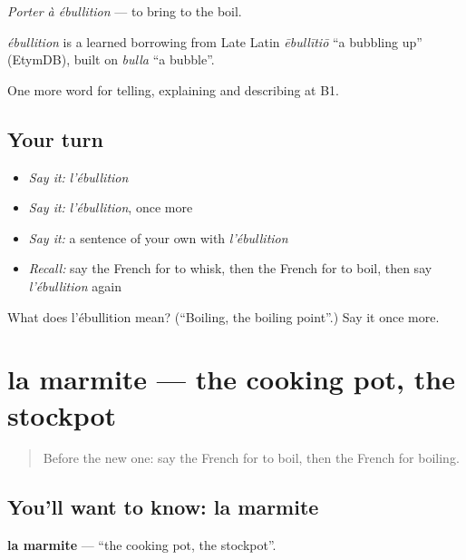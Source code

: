 \emph{Porter à ébullition} — to bring to the boil.

\begin{cousinweb}
\emph{ébullition} is a learned borrowing from Late Latin \emph{ēbullītiō} \textquotedblleft{}a bubbling up\textquotedblright{} (EtymDB), built on \emph{bulla} \textquotedblleft{}a bubble\textquotedblright{}.
\end{cousinweb}

\begin{grammarlens}[title={What you've built}]
One more word for telling, explaining and describing at B1.
\end{grammarlens}

\subsection*{Your turn}
\begin{itemize}
\raggedright
  \item \emph{Say it:} \emph{l'ébullition}
  \item \emph{Say it:} \emph{l'ébullition}, once more
  \item \emph{Say it:} a sentence of your own with \emph{l'ébullition}
  \item \emph{Recall:} say the French for to whisk, then the French for to boil, then say \emph{l'ébullition} again
\end{itemize}

\begin{tcolorbox}[breakable,colback=teal!4,colframe=teal!35!black,title={Before you move on}]
What does l'ébullition mean? (\textquotedblleft{}Boiling, the boiling point\textquotedblright{}.) Say it once more.
\end{tcolorbox}
\section[la marmite]{la marmite — the cooking pot, the stockpot}

\label{lesson:FR-C330-marmite}



\begin{quote}
Before the new one: say the French for to boil, then the French for boiling.
\end{quote}

\subsection*{You'll want to know: la marmite}
\textbf{la marmite} — \textquotedblleft{}the cooking pot, the stockpot\textquotedblright{}.

